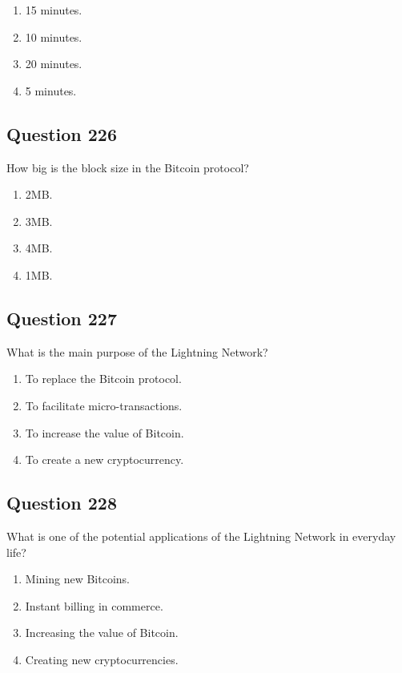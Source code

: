 \documentclass[12pt,a4paper]{article}
\begin{document}
\begin{enumerate}[label=\Alph*., leftmargin=*]
\item 15 minutes.
\item 10 minutes.
\item 20 minutes.
\item 5 minutes.
\end{enumerate}

\bigskip


\subsection*{Question 226}
How big is the block size in the Bitcoin protocol?

\begin{enumerate}[label=\Alph*., leftmargin=*]
\item 2MB.
\item 3MB.
\item 4MB.
\item 1MB.
\end{enumerate}

\bigskip


\subsection*{Question 227}
What is the main purpose of the Lightning Network?

\begin{enumerate}[label=\Alph*., leftmargin=*]
\item To replace the Bitcoin protocol.
\item To facilitate micro-transactions.
\item To increase the value of Bitcoin.
\item To create a new cryptocurrency.
\end{enumerate}

\bigskip


\subsection*{Question 228}
What is one of the potential applications of the Lightning Network in everyday life?

\begin{enumerate}[label=\Alph*., leftmargin=*]
\item Mining new Bitcoins.
\item Instant billing in commerce.
\item Increasing the value of Bitcoin.
\item Creating new cryptocurrencies.
\end{enumerate}
\end{document}
